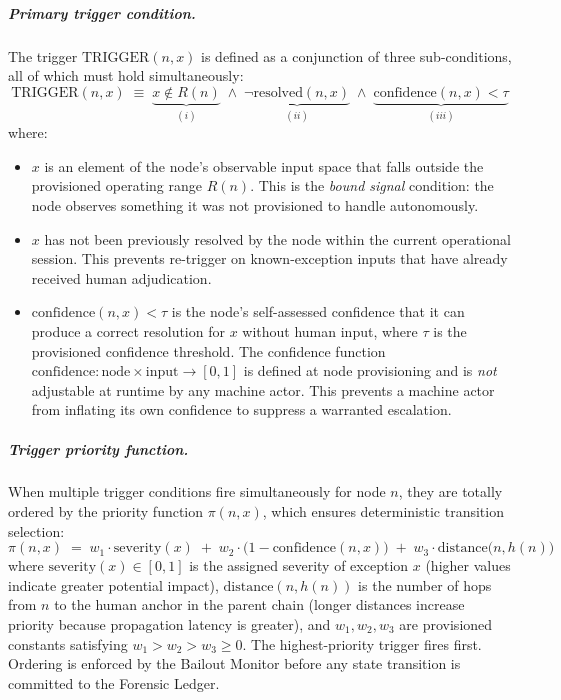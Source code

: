 \subparagraph{Primary trigger condition.} The trigger $\text{TRIGGER}(n, x)$ is defined as a conjunction of three sub-conditions, all of which must hold simultaneously:
\begin{equation}
\text{TRIGGER}(n, x) \;\equiv\; \underbrace{x \notin R(n)}_{(i)} \;\land\; \underbrace{\neg\text{resolved}(n, x)}_{(ii)} \;\land\; \underbrace{\text{confidence}(n, x) < \tau}_{(iii)} \tag{TC}
\end{equation}
where:

\begin{itemize}\itemsep0em
\item[(i)] $x$ is an element of the node's observable input space that falls outside the provisioned operating range $R(n)$. This is the \emph{bound signal} condition: the node observes something it was not provisioned to handle autonomously.
\item[(ii)] $x$ has not been previously resolved by the node within the current operational session. This prevents re-trigger on known-exception inputs that have already received human adjudication.
\item[(iii)] $\text{confidence}(n, x) < \tau$ is the node's self-assessed confidence that it can produce a correct resolution for $x$ without human input, where $\tau$ is the provisioned confidence threshold. The confidence function $\text{confidence} : \text{node} \times \text{input} \rightarrow [0, 1]$ is defined at node provisioning and is \emph{not} adjustable at runtime by any machine actor. This prevents a machine actor from inflating its own confidence to suppress a warranted escalation.
\end{itemize}

\subparagraph{Trigger priority function.} When multiple trigger conditions fire simultaneously for node $n$, they are totally ordered by the priority function $\pi(n, x)$, which ensures deterministic transition selection:
\begin{equation}
\pi(n, x) \;=\; w_1 \cdot \text{severity}(x) \;+\; w_2 \cdot \bigl(1 - \text{confidence}(n, x)\bigr) \;+\; w_3 \cdot \text{distance}\bigl(n, h(n)\bigr) \tag{PF}
\end{equation}
where $\text{severity}(x) \in [0, 1]$ is the assigned severity of exception $x$ (higher values indicate greater potential impact), $\text{distance}(n, h(n))$ is the number of hops from $n$ to the human anchor in the parent chain (longer distances increase priority because propagation latency is greater), and $w_1, w_2, w_3$ are provisioned constants satisfying $w_1 > w_2 > w_3 \geq 0$. The highest-priority trigger fires first. Ordering is enforced by the Bailout Monitor before any state transition is committed to the Forensic Ledger.

